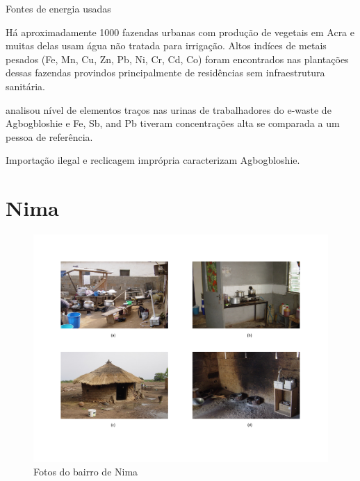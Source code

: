 
\begin{table}[H]
 \centering
  
  \caption{Fontes de energia usadas \cite{censu2013}}
\end{table}

Há aproximadamente 1000 fazendas urbanas com produção de vegetais em Acra e 
muitas delas usam água não tratada para irrigação. Altos indíces de 
metais pesados (Fe, Mn, Cu, Zn, Pb, Ni, Cr, Cd, Co)
foram encontrados nas plantações dessas fazendas \cite{lente2014} provindos 
principalmente de residências sem infraestrutura sanitária. 


\cite{asante2012} analisou nível de elementos traços nas urinas de trabalhadores 
do e-waste de Agbogbloshie e Fe, Sb, and Pb tiveram concentrações alta se comparada
a um pessoa de referência. 

Importação ilegal e reclicagem imprópria caracterizam Agbogbloshie.


\section{Nima}

\begin{figure}[H]
  \caption{Fotos do bairro de Nima}
  \includegraphics[scale=0.35]{../inputs/images/zheng/nima.pdf}
\end{figure}

